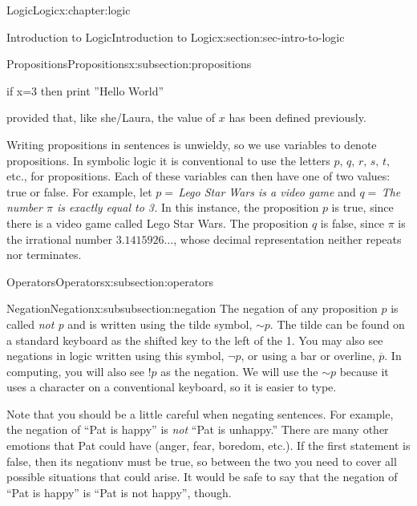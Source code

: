 \documentclass[twoside,10pt,]{book}
\numberwithin{equation}{section}
\begin{document}
\begin{chapterptx}{Logic}{}{Logic}{}{}{x:chapter:logic}
\begin{sectionptx}{Introduction to Logic}{}{Introduction to Logic}{}{}{x:section:sec-intro-to-logic}
\begin{subsectionptx}{Propositions}{}{Propositions}{}{}{x:subsection:propositions}
\begin{codedisplay}
              if x=3 then print ''Hello World''
            
\end{codedisplay}
provided that, like she\slash{}Laura, the value of \(x\) has been defined previously.%
\par
Writing propositions in sentences is unwieldy, so we use variables to denote propositions.  In symbolic logic it is conventional to use the letters \(p,\, q,\, r,\, s,\, t,\,\) etc., for propositions.  Each of these variables can then have one of two values: true or false.  For example, let \(p =\,\)\emph{Lego Star Wars is a video game} and \(q =\,\)\emph{The number \(\pi\) is exactly equal to 3.}  In this instance, the proposition \(p\) is true, since there is a video game called Lego Star Wars.  The proposition \(q\) is false, since \(\pi\) is the irrational number \(3.1415926\ldots\), whose decimal representation neither repeats nor terminates.%
\end{subsectionptx}
%
%
\typeout{************************************************}
\typeout{************************************************}
%
\begin{subsectionptx}{Operators}{}{Operators}{}{}{x:subsection:operators}
%
%
\typeout{************************************************}
\typeout{************************************************}
%
\begin{subsubsectionptx}{Negation}{}{Negation}{}{}{x:subsubsection:negation}
The negation of any proposition \(p\) is called \emph{not p} and is written using the tilde symbol, \(\sim\!{p}\).  The tilde can be found on a standard keyboard as the shifted key to the left of the 1.  You may also see negations in logic written using this symbol, \(\neg p\), or using a bar or overline, \(\overline{p}\).  In computing, you will also see \(!p\) as the negation.  We will use the \(\sim\!{p}\) because it uses a character on a conventional keyboard, so it is easier to type.%
\par
Note that you should be a little careful when negating sentences.  For example, the negation of ``Pat is happy'' is \emph{not} ``Pat is unhappy.''  There are many other emotions that Pat could have (anger, fear, boredom, etc.).  If the first statement is false, then its negationv must be true, so between the two you need to cover all possible situations that could arise. It would be safe to say that the negation of ``Pat is happy'' is ``Pat is not happy'', though.%

\end{subsubsectionptx}
\end{subsectionptx}
\end{sectionptx}
\end{chapterptx}
\end{document}

